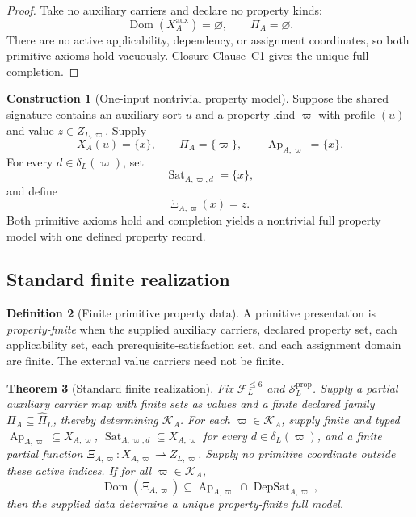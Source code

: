 \documentclass[11pt]{article}
\newcommand{\FVI}{\mathcal F_{L}^{\le 6}}
\newcommand{\Sprop}{\mathcal S_{L}^{\mathrm{prop}}}
\newcommand{\Pihat}{\widehat{\Pi}_{L}}
\newcommand{\Ap}{\operatorname{Ap}}
\newcommand{\DepSat}{\operatorname{DepSat}}
\newcommand{\Sat}{\operatorname{Sat}}
\newcommand{\Dom}{\operatorname{Dom}}
\newtheorem{theorem}{Theorem}[section]
\theoremstyle{definition}
\newtheorem{definition}[theorem]{Definition}
\newtheorem{construction}[theorem]{Construction}
\theoremstyle{remark}
\begin{document}
\begin{proof}
Take no auxiliary carriers and declare no property kinds:
\[
\Dom(X_A^{\mathrm{aux}})=\varnothing,
\qquad
\Pi_A=\varnothing.
\]
There are no active applicability, dependency, or assignment coordinates, so both primitive axioms hold vacuously.
Closure Clause~C1 gives the unique full completion.
\end{proof}

\begin{construction}[One-input nontrivial property model]
Suppose the shared signature contains an auxiliary sort \(u\) and a property kind \(\varpi\) with profile \((u)\) and value \(z\in Z_{L,\varpi}\).
Supply
\[
X_A(u)=\{x\},
\qquad
\Pi_A=\{\varpi\},
\qquad
\Ap_{A,\varpi}=\{x\}.
\]
For every \(d\in\delta_L(\varpi)\), set
\[
\Sat_{A,\varpi,d}=\{x\},
\]
and define
\[
\Xi_{A,\varpi}(x)=z.
\]
Both primitive axioms hold and completion yields a nontrivial full property model with one defined property record.
\end{construction}

\subsection{Standard finite realization}

\begin{definition}[Finite primitive property data]
A primitive presentation is \emph{property-finite} when the supplied auxiliary carriers, declared property set, each applicability set, each prerequisite-satisfaction set, and each assignment domain are finite.
The external value carriers need not be finite.
\end{definition}

\begin{theorem}[Standard finite realization]
\label{thm:finite-realization}
Fix \(\FVI\) and \(\Sprop\). Supply a partial auxiliary carrier map
with finite sets as values and a finite declared family
\(\Pi_A\subseteq\Pihat\), thereby determining \(\mathcal K_A\).
For each \(\varpi\in\mathcal K_A\), supply finite and typed
\(\Ap_{A,\varpi}\subseteq X_{A,\varpi}\),
\(\Sat_{A,\varpi,d}\subseteq X_{A,\varpi}\) for every
\(d\in\delta_L(\varpi)\), and a finite partial function
\(\Xi_{A,\varpi}:X_{A,\varpi}\rightharpoonup Z_{L,\varpi}\).
Supply no primitive coordinate outside these active indices.
If for all \(\varpi\in\mathcal K_A\),
\[
\Dom(\Xi_{A,\varpi})\subseteq
\Ap_{A,\varpi}\cap\DepSat_{A,\varpi},
\]
then the supplied data determine a unique property-finite full model.
\end{theorem}
\end{document}
